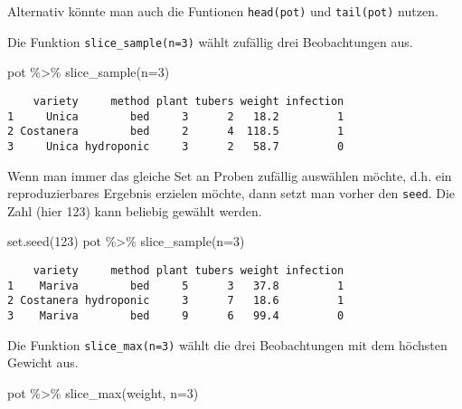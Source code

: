 \documentclass[
  letterpaper,
  DIV=11,
  numbers=noendperiod]{scrartcl}
\newenvironment{Shaded}{\begin{snugshade}}{\end{snugshade}}
\newcommand{\AttributeTok}[1]{\textcolor[rgb]{0.40,0.45,0.13}{#1}}
\newcommand{\DecValTok}[1]{\textcolor[rgb]{0.68,0.00,0.00}{#1}}
\newcommand{\FunctionTok}[1]{\textcolor[rgb]{0.28,0.35,0.67}{#1}}
\newcommand{\NormalTok}[1]{\textcolor[rgb]{0.00,0.23,0.31}{#1}}
\newcommand{\SpecialCharTok}[1]{\textcolor[rgb]{0.37,0.37,0.37}{#1}}
\begin{document}
Alternativ könnte man auch die Funtionen \texttt{head(pot)} und
\texttt{tail(pot)} nutzen.

Die Funktion \texttt{slice\_sample(n=3)} wählt zufällig drei
Beobachtungen aus.

\begin{Shaded}
\begin{Highlighting}[]
\NormalTok{pot }\SpecialCharTok{\%\textgreater{}\%} \FunctionTok{slice\_sample}\NormalTok{(}\AttributeTok{n=}\DecValTok{3}\NormalTok{)}
\end{Highlighting}
\end{Shaded}

\begin{verbatim}
    variety     method plant tubers weight infection
1     Unica        bed     3      2   18.2         1
2 Costanera        bed     2      4  118.5         1
3     Unica hydroponic     3      2   58.7         0
\end{verbatim}

Wenn man immer das gleiche Set an Proben zufällig auswählen möchte, d.h.
ein reproduzierbares Ergebnis erzielen möchte, dann setzt man vorher den
\texttt{seed}. Die Zahl (hier 123) kann beliebig gewählt werden.

\begin{Shaded}
\begin{Highlighting}[]
\FunctionTok{set.seed}\NormalTok{(}\DecValTok{123}\NormalTok{)}
\NormalTok{pot }\SpecialCharTok{\%\textgreater{}\%} \FunctionTok{slice\_sample}\NormalTok{(}\AttributeTok{n=}\DecValTok{3}\NormalTok{)}
\end{Highlighting}
\end{Shaded}

\begin{verbatim}
    variety     method plant tubers weight infection
1    Mariva        bed     5      3   37.8         1
2 Costanera hydroponic     3      7   18.6         1
3    Mariva        bed     9      6   99.4         0
\end{verbatim}

Die Funktion \texttt{slice\_max(n=3)} wählt die drei Beobachtungen mit
dem höchsten Gewicht aus.

\begin{Shaded}
\begin{Highlighting}[]
\NormalTok{pot }\SpecialCharTok{\%\textgreater{}\%} \FunctionTok{slice\_max}\NormalTok{(weight, }\AttributeTok{n=}\DecValTok{3}\NormalTok{)}
\end{Highlighting}
\end{Shaded}
\end{document}
